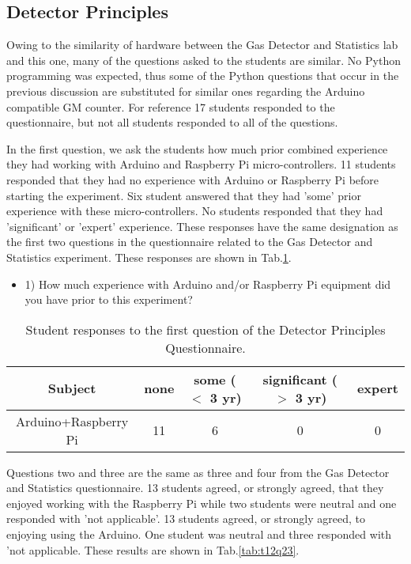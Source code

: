 \subsection{Detector Principles}
Owing to the similarity of hardware between the Gas Detector and Statistics lab and this one, many of the questions asked to the students are similar.
No Python programming was expected, thus some of the Python questions that occur in the previous discussion are substituted for similar ones regarding the Arduino compatible GM counter.
For reference 17 students responded to the questionnaire, but not all students responded to all of the questions.

In the first question, we ask the students how much prior combined experience they had working with Arduino and Raspberry Pi micro-controllers.
11 students responded that they had no experience with Arduino or Raspberry Pi before starting the experiment.
Six student answered that they had 'some' prior experience with these micro-controllers.
No students responded that they had 'significant' or 'expert' experience.
These responses have the same designation as the first two questions in the questionnaire related to the Gas Detector and Statistics experiment.
These responses are shown in Tab.\ref{tab:t12q1}.

\begin{table}[htpb]
  \scriptsize
  \begin{center}
    \caption{\scriptsize Student responses to the first question of the Detector Principles Questionnaire.}
    \label{tab:t12q1}
    \begin{itemize}
    \item 1) How much experience with Arduino and/or Raspberry Pi equipment did you have prior to this experiment?
    \end{itemize}
    

    \begin{tabular}{|c | c | c | c | c |}
      \hline
      Subject & none & some ($<$ 3 yr) & significant  ($>$ 3 yr) & expert\\
      \hline
      Arduino+Raspberry Pi & 11 & 6 & 0 & 0\\
      \hline
    \end{tabular}
  \end{center}%
\end{table}

Questions two and three are the same as three and four from the Gas Detector and Statistics questionnaire.
13 students agreed, or strongly agreed, that they enjoyed working with the Raspberry Pi while two students were neutral and one responded with 'not applicable'.
13 students agreed, or strongly agreed, to enjoying using the Arduino.
One student was neutral and three responded with 'not applicable.
These results are shown in Tab.\ref{tab:t12q23}.


